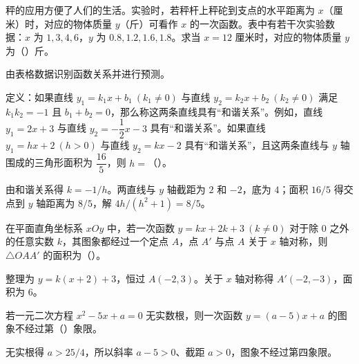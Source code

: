 \documentclass{exam-zh}
\begin{document}
\begin{question}[points=4]
  秤的应用方便了人们的生活。实验时，若秤杆上秤砣到支点的水平距离为 $x$（厘米）时，对应的物体质量 $y$（斤）可看作 $x$ 的一次函数。表中有若干次实验数据：$x$ 为 $1,3,4,6$，$y$ 为 $0.8,1.2,1.6,1.8$。求当 $x=12$ 厘米时，对应的物体质量 $y$ 为（\qquad）斤。
  \paren[$3$]
  \begin{solutionblock}
    由表格数据识别函数关系并进行预测。
  \end{solutionblock}
\end{question}



\begin{question}[points=4]
  定义：如果直线 $y_1=k_1x+b_1\ (k_1\ne0)$ 与直线 $y_2=k_2x+b_2\ (k_2\ne0)$ 满足 $k_1k_2=-1$ 且 $b_1+b_2=0$，那么称这两条直线具有“和谐关系”。例如，直线 $y_1=2x+3$ 与直线 $y_2=-\dfrac12x-3$ 具有“和谐关系”。如果直线 $y_1=hx+2\ (h>0)$ 与直线 $y_2=kx-2$ 具有“和谐关系”，且这两条直线与 $y$ 轴围成的三角形面积为 $\dfrac{16}{5}$，则 $h=$（\qquad）。
  \paren[$h=\dfrac12$ 或 $h=2$]
  \begin{solutionblock}
    由和谐关系得 $k=-1/h$。两直线与 $y$ 轴截距为 $2$ 和 $-2$，底为 $4$；面积 $16/5$ 得交点到 $y$ 轴距离为 $8/5$，解 $4h/(h^2+1)=8/5$。
  \end{solutionblock}
\end{question}



\begin{question}[points=4]
  在平面直角坐标系 $xOy$ 中，若一次函数 $y=kx+2k+3\ (k\ne0)$ 对于除 $0$ 之外的任意实数 $k$，其图象都经过一个定点 $A$，点 $A'$ 与点 $A$ 关于 $x$ 轴对称，则 $\triangle OAA'$ 的面积为（\qquad）。
  \paren[$6$]
  \begin{solutionblock}
    整理为 $y=k(x+2)+3$，恒过 $A(-2,3)$。关于 $x$ 轴对称得 $A'(-2,-3)$，面积为 $6$。
  \end{solutionblock}
\end{question}



\begin{question}[points=4]
  若一元二次方程 $x^2-5x+a=0$ 无实数根，则一次函数 $y=(a-5)x+a$ 的图象不经过第（\qquad）象限。
  \paren[第四象限]
  \begin{solutionblock}
    无实根得 $a>25/4$，所以斜率 $a-5>0$、截距 $a>0$，图象不经过第四象限。
  \end{solutionblock}
\end{question}


\end{document}
